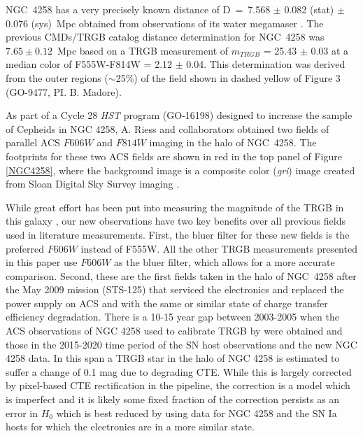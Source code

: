\documentclass[twocolumn]{aastex62}
\begin{document}
NGC~4258 has a very precisely known distance of D~=~7.568 $\pm$ 0.082 (stat) $\pm$ 0.076 (sys)~Mpc obtained from observations of its water megamaser \citep{2019ApJ...886L..27R}. The previous CMDs/TRGB catalog distance determination for NGC~4258 was $7.65\pm0.12$~Mpc based on a TRGB measurement of $m_{TRGB}$ = 25.43 $\pm$ 0.03 at a median color of F555W-F814W = 2.12 $\pm$ 0.04. This determination was derived from the outer regions ($\sim$25$\%$) of the field shown in dashed yellow of Figure 3 (GO-9477, PI. B. Madore). 

As part of a Cycle 28 \textit{HST} program (GO-16198) designed to increase the sample of Cepheids in NGC 4258, A. Riess and collaborators obtained two fields of parallel ACS $F606W$ and $F814W$ imaging in the halo of NGC~4258. The footprints for these two ACS fields are shown in red in the top panel of Figure \ref{NGC4258}, where the background image is a composite color (\textit{gri}) image created from Sloan Digital Sky Survey imaging \citep{2000AJ....120.1579Y}. 

While great effort has been put into measuring the magnitude of the TRGB in this galaxy \citep{2006ApJ...652.1133M, 2007ApJ...661..815R, 2008ApJ...689..721M, 2021ApJ...906..125J}, our new observations have two key benefits over all previous fields used in literature measurements. First, the bluer filter for these new fields is the preferred $F606W$ instead of F555W. All the other TRGB measurements presented in this paper use $F606W$ as the bluer filter, which allows for a more accurate comparison. Second, these are the first fields taken in the halo of NGC~4258 after the May 2009 mission (STS-125) that serviced the electronics and replaced the power supply on ACS and with the same or similar state of charge transfer efficiency degradation. There is a 10-15 year gap between 2003-2005 when the ACS observations of NGC 4258 used to calibrate TRGB by \citet{2021ApJ...906..125J} were obtained and those in the 2015-2020 time period of the SN host observations and the new NGC 4258 data.  In this span a TRGB star in the halo of NGC 4258 is estimated to suffer a change of 0.1 mag due to degrading CTE. While this is largely corrected by pixel-based CTE rectification in the pipeline, the correction is a model which is imperfect and it is likely some fixed fraction of the correction persists as an error in $H_0$ which is best reduced by using data for NGC 4258 and the SN Ia hosts for which the electronics are in a more similar state.
\end{document}
